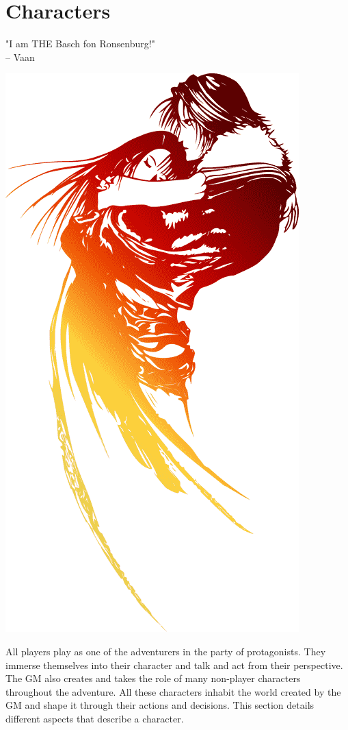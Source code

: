 \section*{\hypertarget{char}{Characters}}
%
"I am THE Basch fon Ronsenburg!" \\
\indent -- Vaan
%
\begin{center} \includegraphics[width=0.9\columnwidth]{./art/images/ff8.png} \end{center}
%
All players play as one of the adventurers in the party of protagonists. 
They immerse themselves into their character and talk and act from their perspective. 
The GM also creates and takes the role of many non-player characters throughout the adventure.
All these characters inhabit the world created by the GM and shape it through their actions and decisions.
This section details different aspects that describe a character. 

